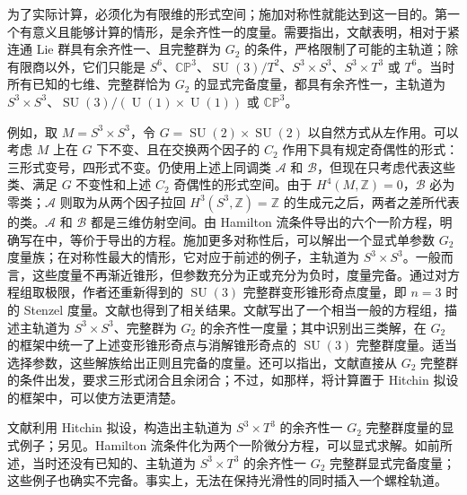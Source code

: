 为了实际计算，必须化为有限维的形式空间；施加对称性就能达到这一目的。第一个有意义且能够计算的情形，是余齐性一的度量。需要指出，文献表明，相对于紧连通 Lie 群具有余齐性一、且完整群为 $G_2$ 的条件，严格限制了可能的主轨道；除有限商以外，它们只能是 $S^6$、$\mathbb{CP}^3$、$\operatorname{SU}(3)/T^2$、$S^3\times S^3$、$S^3\times T^3$ 或 $T^6$。当时所有已知的七维、完整群恰为 $G_2$ 的显式完备度量，都具有余齐性一，主轨道为 $S^3\times S^3$、$\operatorname{SU}(3)/(\operatorname U(1)\times\operatorname U(1))$ 或 $\mathbb{CP}^3$。

例如，取 $M=S^3\times S^3$，令 $G=\operatorname{SU}(2)\times\operatorname{SU}(2)$ 以自然方式从左作用。可以考虑 $M$ 上在 $G$ 下不变、且在交换两个因子的 $C_2$ 作用下具有规定奇偶性的形式：三形式变号，四形式不变。仍使用上述上同调类 $\mathcal A$ 和 $\mathcal B$，但现在只考虑代表这些类、满足 $G$ 不变性和上述 $C_2$ 奇偶性的形式空间。由于 $H^4(M,\mathbb Z)=0$，$\mathcal B$ 必为零类；$\mathcal A$ 则取为从两个因子拉回 $H^3(S^3,\mathbb Z)=\mathbb Z$ 的生成元之后，两者之差所代表的类。$\mathcal A$ 和 $\mathcal B$ 都是三维仿射空间。由 Hamilton 流条件导出的六个一阶方程，明确写在中，等价于导出的方程。施加更多对称性后，可以解出一个显式单参数 $G_2$ 度量族；在对称性最大的情形，它对应于前述的例子，主轨道为 $S^3\times S^3$。一般而言，这些度量不再渐近锥形，但参数充分为正或充分为负时，度量完备。通过对方程组取极限，作者还重新得到的 $\operatorname{SU}(3)$ 完整群变形锥形奇点度量，即 $n=3$ 时的 Stenzel 度量。文献也得到了相关结果。文献写出了一个相当一般的方程组，描述主轨道为 $S^3\times S^3$、完整群为 $G_2$ 的余齐性一度量；其中识别出三类解，在 $G_2$ 的框架中统一了上述变形锥形奇点与消解锥形奇点的 $\operatorname{SU}(3)$ 完整群度量。适当选择参数，这些解族给出正则且完备的度量。还可以指出，文献直接从 $G_2$ 完整群的条件出发，要求三形式闭合且余闭合；不过，如那样，将计算置于 Hitchin 拟设的框架中，可以使方法更清楚。

文献利用 Hitchin 拟设，构造出主轨道为 $S^3\times T^3$ 的余齐性一 $G_2$ 完整群度量的显式例子；另见。Hamilton 流条件化为两个一阶微分方程，可以显式求解。如前所述，当时还没有已知的、主轨道为 $S^3\times T^3$ 的余齐性一 $G_2$ 完整群显式完备度量；这些例子也确实不完备。事实上，无法在保持光滑性的同时插入一个螺栓轨道。

